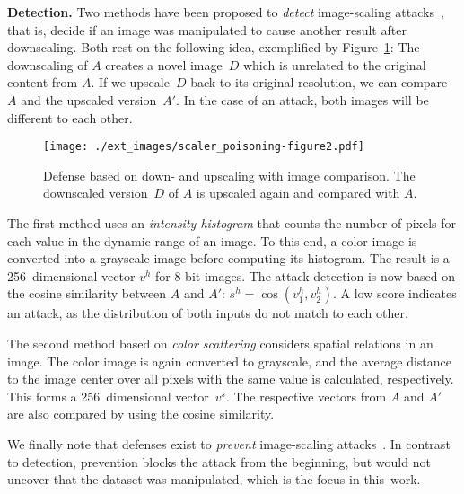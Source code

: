 \documentclass[conference]{IEEEtran}
\renewcommand{\paragraph}[1]{{\vskip 8pt \noindent\bf #1 }}
\newcommand{\attimg}{\ensuremath{A}\xspace}
\newcommand{\outimg}{\ensuremath{D}\xspace}
\begin{document}
\paragraph{Detection.}
Two methods have been proposed to \emph{detect} image-scaling 
attacks~\citep{XiaCheShe+19}, that is, decide if an image was 
manipulated to cause another result after downscaling.
Both rest on the following idea, exemplified by 
Figure~\ref{fig:defenses_detection_example}: The downscaling of \attimg 
creates a novel image~\outimg which is unrelated to the original 
content from \attimg. If we upscale~\outimg back to its original 
resolution, we can compare \attimg and the upscaled 
version~$\attimg'$. In the case of an attack, both images will be 
different to each other.

\begin{figure}[h]
	\centering
	\texttt{[image: ./ext\_images/scaler\_poisoning-figure2.pdf]}
	\vspace{-0.4em}
	\caption{Defense based on down- and upscaling with image comparison.
		The downscaled version~\outimg of \attimg is upscaled again and
		compared with \attimg.}
	\label{fig:defenses_detection_example}
\end{figure}

The first method uses an \emph{intensity histogram} that counts 
the number of pixels for each value in the dynamic range of an image. 
To this end, a color image is converted into a grayscale
image before computing its histogram. The result is a 256~dimensional 
vector $v^h$ for 8-bit images.
The attack detection is now based on the cosine similarity 
between $\attimg$ and $\attimg'$: $s^h = \cos (v^h_1, v^h_{2} )$. A 
low score indicates an attack, as the distribution of both inputs do 
not match to each other.

The second method based on \emph{color scattering} considers spatial 
relations in an image. The color image is again converted to 
grayscale, and the average distance to the image center over 
all pixels with the same value is calculated, respectively. This forms 
a 256~dimensional vector~$v^s$. The respective vectors from $\attimg$ 
and $\attimg'$ are also compared by using the cosine similarity.

We finally note that defenses exist to \emph{prevent} 
image-scaling attacks~\citep[see][]{QuiKleArp20}. 
In contrast to detection, prevention blocks the attack from 
the beginning, but would not uncover that the dataset was 
manipulated, which is the focus in this~work.
\end{document}
